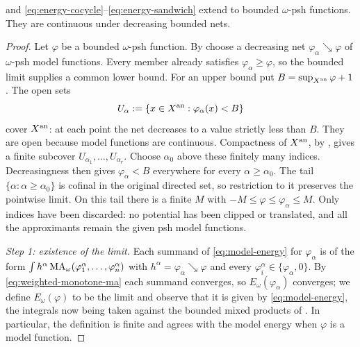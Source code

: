\begin{proposition}\label{prop:bounded-energy-identities}
 and
\eqref{eq:energy-cocycle}--\eqref{eq:energy-sandwich} extend to bounded
\(\omega\)-psh functions. They are continuous under decreasing bounded nets.
\end{proposition}

\begin{proof}
Let \(\varphi\) be a bounded \(\omega\)-psh function.  By
 choose a decreasing net
\(\varphi_\alpha\searrow\varphi\) of \(\omega\)-psh model functions.
Every member already satisfies \(\varphi_\alpha\geq\varphi\), so the
bounded limit supplies a common lower bound.  For an upper bound put
\(B=\sup_{X^{\mathrm{an}}}\varphi+1\).  The open sets
\[
 U_\alpha:=\{x\in X^{\mathrm{an}}:\varphi_\alpha(x)<B\}
\]
cover \(X^{\mathrm{an}}\): at each point the net decreases to a value strictly
less than \(B\).  They are open because model functions are continuous.
Compactness of \(X^{\mathrm{an}}\), by , gives a
finite subcover \(U_{\alpha_1},\ldots,U_{\alpha_r}\).  Choose
\(\alpha_0\) above these finitely many indices.  Decreasingness then gives
\(\varphi_\alpha<B\) everywhere for every \(\alpha\geq\alpha_0\).
The tail \(\{\alpha:\alpha\geq\alpha_0\}\) is cofinal in the original
directed set, so restriction to it preserves the pointwise limit.  On
this tail there is a finite \(M\) with
\(-M\leq\varphi\leq\varphi_\alpha\leq M\).
Only indices have been discarded: no potential has been clipped or
translated, and all the approximants remain the given psh model functions.

\emph{Step 1: existence of the limit.}  Each summand of
\eqref{eq:model-energy} for \(\varphi_\alpha\) is of the form
\(\int h^\alpha\operatorname{MA}_\omega(\varphi_1^\alpha,\ldots,\varphi_n^\alpha)\) with
\(h^\alpha=\varphi_\alpha\searrow\varphi\) and every
\(\varphi_i^\alpha\in\{\varphi_\alpha,0\}\).  By
\eqref{eq:weighted-monotone-ma} each summand converges, so
\(E_\omega(\varphi_\alpha)\) converges; we define \(E_\omega(\varphi)\) to be
the limit and observe that it is given by \eqref{eq:model-energy}, the
integrals now being taken against the bounded mixed products of
.  In particular, the definition is finite
and agrees with the model energy when \(\varphi\) is a model function.


\end{proof}
